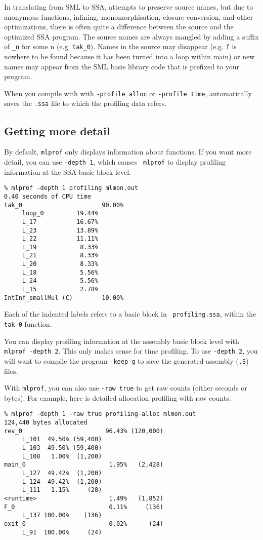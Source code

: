 In translating from SML to SSA, {\mlton} attempts to preserve source
names, but due to anonymous functions, inlining, monomorphisation,
closure conversion, and other optimizations, there is often quite a
difference between the source and the optimized SSA program.  The
source names are always mangled by adding a suffix of {\tt \_n} for
some n (e.g. {\tt tak\_0}).  Names in the source may disappear (e.g.
{\tt f} is nowhere to be found because it has been turned into a loop
within main) or new names may appear from the SML basis library code
that is prefixed to your program.

When you compile with with {\tt -profile alloc} or {\tt -profile
time}, {\mlton} automatically saves the {\tt .ssa} file to which the
profiling data refers.

\subsection{Getting more detail}

By default, {\tt mlprof} only displays information about functions.
If you want more detail, you can use {\tt -depth 1}, which causes {\tt
mlprof} to display profiling information at the SSA basic block level.

\begin{verbatim}
% mlprof -depth 1 profiling mlmon.out
0.40 seconds of CPU time
tak_0                      90.00%
     loop_0         19.44%       
     L_17           16.67%       
     L_23           13.89%       
     L_22           11.11%       
     L_19            8.33%       
     L_21            8.33%       
     L_20            8.33%       
     L_18            5.56%       
     L_24            5.56%       
     L_15            2.78%       
IntInf_smallMul (C)        10.00%
\end{verbatim}

Each of the indented labels refers to a basic block in {\tt
profiling.ssa}, within the {\tt tak\_0} function.

You can display profiling information at the assembly basic block
level with {\tt mlprof -depth 2}.  This only makes sense for time
profiling.  To use {\tt -depth 2}, you will want to compile the
program {\tt -keep g} to save the generated assembly ({\tt .S}) files.

With {\tt mlprof}, you can also use {\tt -raw true} to get raw counts
(either seconds or bytes).  For example, here is detailed allocation
profiling with raw counts.
\begin{verbatim}
% mlprof -depth 1 -raw true profiling-alloc mlmon.out
124,440 bytes allocated
rev_0                       96.43% (120,000)
     L_101  49.50% (59,400)                 
     L_103  49.50% (59,400)                 
     L_108   1.00%  (1,200)                 
main_0                       1.95%   (2,428)
     L_127  49.42%  (1,200)                 
     L_124  49.42%  (1,200)                 
     L_111   1.15%     (28)                 
<runtime>                    1.49%   (1,852)
F_0                          0.11%     (136)
     L_137 100.00%    (136)                 
exit_0                       0.02%      (24)
     L_91  100.00%     (24)
\end{verbatim}

